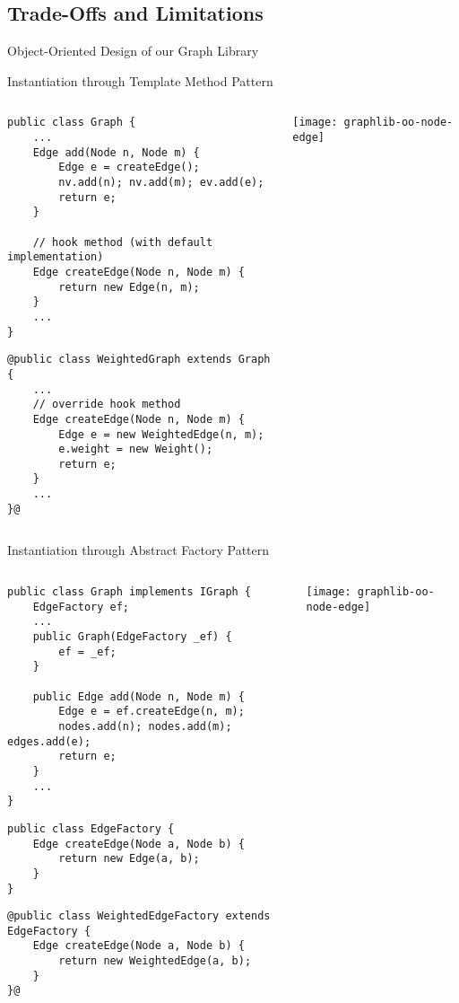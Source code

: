 \subsection{Trade-Offs and Limitations}

\begin{frame}{Object-Oriented Design of our Graph Library}
\end{frame}

\begin{frame}[fragile]{Instantiation through Template Method Pattern}
		\begin{columns}
\begin{tiny}
\begin{lstlisting}
public class Graph {
	...
	Edge add(Node n, Node m) {
		Edge e = createEdge();
		nv.add(n); nv.add(m); ev.add(e);
		return e;
	}
	
	// hook method (with default implementation)
	Edge createEdge(Node n, Node m) {
		return new Edge(n, m);
	}
	...
}
\end{lstlisting}
\begin{lstlisting}
@public class WeightedGraph extends Graph {
	...
	// override hook method
	Edge createEdge(Node n, Node m) {
		Edge e = new WeightedEdge(n, m);
		e.weight = new Weight();
		return e;
	}
	...
}@
\end{lstlisting}
\end{tiny}	
				\texttt{[image: graphlib-oo-node-edge]}	
		\end{columns}
\end{frame}

\begin{frame}[fragile]{Instantiation through Abstract Factory Pattern}
		\begin{columns}
			\column{.45\textwidth}
\begin{tiny}
\begin{lstlisting}
public class Graph implements IGraph {
	EdgeFactory ef;
	...
	public Graph(EdgeFactory _ef) {
		ef = _ef;
	}
	
	public Edge add(Node n, Node m) {
		Edge e = ef.createEdge(n, m);
		nodes.add(n); nodes.add(m); edges.add(e);
		return e;
	}
	...
}
\end{lstlisting}
\begin{lstlisting}
public class EdgeFactory {
	Edge createEdge(Node a, Node b) {
		return new Edge(a, b);
	}
}
\end{lstlisting}
\begin{lstlisting}
@public class WeightedEdgeFactory extends EdgeFactory {
	Edge createEdge(Node a, Node b) {
		return new WeightedEdge(a, b);
	}
}@
\end{lstlisting}
\end{tiny}	
			\column{.45\textwidth}
				\texttt{[image: graphlib-oo-node-edge]}	
		\end{columns}
\end{frame}

